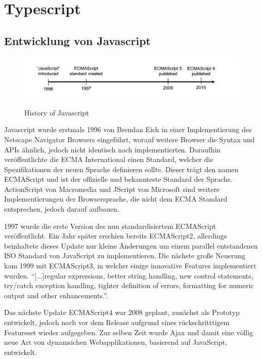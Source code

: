 \section{Typescript}

\subsection{Entwicklung von Javascript}

\begin{figure}[ht]
 \centering
 \includegraphics[width=\linewidth]{kapitel2/javascript-timeline.png}
 \caption{History of Javascript}\cite[28]{EssentialTS}
\end{figure}

Javascript wurde erstmals 1996 von Brendan Eich in einer Implementierung des Netscape Navigator Browsers eingeführt,
worauf weitere Browser die Syntax und APIs ähnlich, jedoch nicht identisch nach implementierten.
Daraufhin veröffentlichte die ECMA International einen Standard, welcher die Spezifikationen der neuen Sprache
definieren sollte. Dieser trägt den namen ECMAScript und ist der offizielle und bekannteste Standard der
Sprache. ActionScript von Macromedia und JScript von Microsoft sind weitere Implementierungen der Browsersprache,
die nicht dem ECMA Standard entsprechen, jedoch darauf aufbauen.

1997 wurde die erste Version des nun standardisiertem ECMAScript veröffentlicht. Ein Jahr später erschien bereits ECMAScript2,
allerdings beinhaltete dieses Update nur kleine Änderungen um einem parallel entstandenen ISO Standard von JavaScript zu implementieren.
Die nächste große Neuerung kam 1999 mit ECMAScript3, in welcher einige innovative Features implementiert wurden.
``[...]regular expressions, better string handling, new control statements, try/catch exception handling, tighter definition of errors, formatting for numeric output and other enhancements.''\cite{js-vs-es}.

Das nächste Update ECMAScript4 war 2008 geplant, zunächst als Prototyp entwickelt,
jedoch noch vor dem Release aufgrund eines rückschritttigem Featureset wieder aufgegeben.
Zur selben Zeit wurde Ajax und damit eine völlig neue Art von dynamsichen Webapplikationen,
basierend auf JavaScript, entwickelt.

